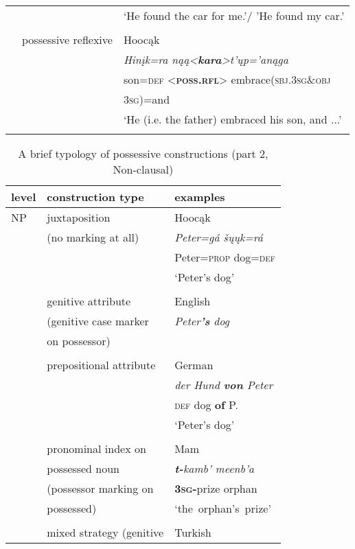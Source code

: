 \documentclass[output=paper]{LSP/langsci}
\begin{document}
\begin{table}
\begin{tabular}{l l l }
& & `He found the car for me.'/ 'He found my car.' \\
& \\
& possessive reflexive & Hooc\k{a}k \citep{HelmbrechtLehmann2010} \\
& & \textit{Hinįk=ra n\k{a}\k{a}<\textbf{kara}>t’ųp='an\k{a}ga} \\
& & son=\textsc{def} <\textbf{\textsc{poss.rfl}}> embrace(\textsc{sbj.3sg}\&\textsc{obj} \\
& & \textsc{3sg})=and \\
& &  `He (i.e. the father) embraced his son, and ...'\\
\lspbottomrule
\end{tabular}
\end{table} 

\begin{table}
\caption{A brief typology of possessive constructions (part 2, Non-clausal)} \label{typology2}
\begin{tabularx}{\textwidth}{l l X }
\lsptoprule
level & construction type & examples \\
\midrule
NP  & juxtaposition & Hooc\k{a}k \citep[13]{Helmbrecht2003}  \\
& (no marking at all) & \textit{Peter=gá        šųųk=rá} \\
&  & Peter=\textsc{prop}  dog=\textsc{def} \\
& & `Peter's dog' \\
& \\
& genitive attribute & English \\
& (genitive case marker & \textit{Peter\textbf{'s} dog} \\
&  on possessor) & \\
& \\
& prepositional attribute & German \\
& & \textit{der Hund \textbf{von} Peter} \\
& & \textsc{def} dog    \textbf{of}   P. \\
& & `Peter's dog' \\
& \\
 & pronominal index on  & Mam \citep[142]{England1983} \\
& possessed noun & \textit{\textbf{t-}kamb'    meenb'a} \\
& (possessor marking on & \textbf{\textsc{3sg}-}prize orphan \\
& possessed) & \mbox{`the orphan's prize'}  \\
& \\
& mixed strategy (genitive & Turkish \citep[633]{Kornfilt1990} \\

\end{tabularx}
\end{table}
\end{document}
